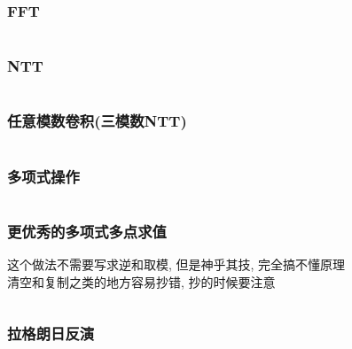 \documentclass[a4paper]{article}
\begin{document}
\begin{multicols}{2}
				\subsubsection{FFT}
					\inputminted{cpp}{../src/math/FFT.cpp}

				\subsubsection{NTT}
					\inputminted{cpp}{../src/math/NTT.cpp}

				\subsubsection{任意模数卷积(三模数NTT)}
					\inputminted{cpp}{../src/math/任意模数卷积.cpp}


			
				\subsubsection{多项式操作}
					\inputminted{cpp}{../src/math/多项式操作.cpp}

				\subsubsection{更优秀的多项式多点求值}
					这个做法不需要写求逆和取模, 但是神乎其技, 完全搞不懂原理 \\
					清空和复制之类的地方容易抄错, 抄的时候要注意
					\inputminted{cpp}{../src/math/更优秀的多项式多点求值.cpp}




				\subsubsection{拉格朗日反演}
					




\end{multicols}
\end{document}
